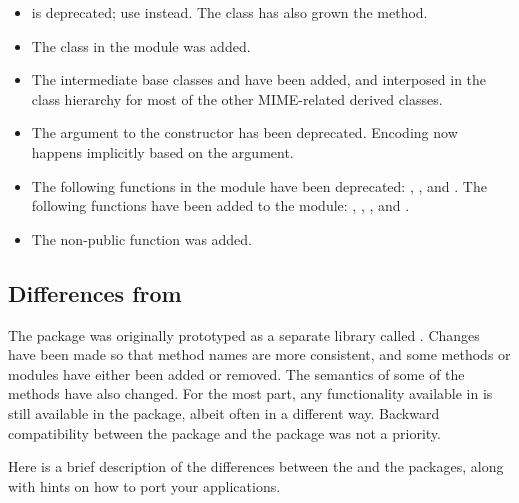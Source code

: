 \begin{itemize}
\item {} is deprecated; use
       instead.  The 
      class has also grown the  method.

\item The  class in the
       module was added.

\item The intermediate base classes  and
       have been added, and interposed in the
      class hierarchy for most of the other MIME-related derived
      classes.

\item The  argument to the  constructor
      has been deprecated.  Encoding  now happens implicitly based
      on the  argument.

\item The following functions in the  module have
      been deprecated: ,
      , and .  The following
      functions have been added to the module:
      , ,
      , and .

\item The non-public function 
      was added.
\end{itemize}

\subsection{Differences from }

The  package was originally prototyped as a separate
library called
.
Changes have been made so that
method names are more consistent, and some methods or modules have
either been added or removed.  The semantics of some of the methods
have also changed.  For the most part, any functionality available in
 is still available in the  package,
albeit often in a different way.  Backward compatibility between
the  package and the  package was not a
priority.

Here is a brief description of the differences between the
 and the  packages, along with hints on
how to port your applications.

